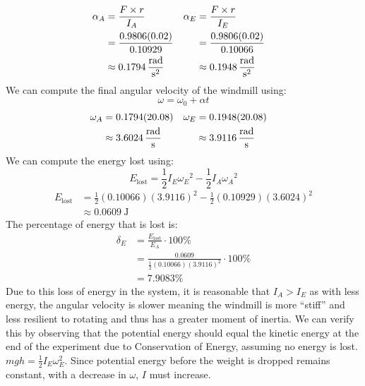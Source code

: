 \documentclass[article, 11pt]{article}
\begin{document}
    \begin{alignat*}{2}
        \begin{aligned}
            \alpha_A  &= \frac{F \times r}{I_A} \\
                      &= \frac{0.9806(0.02)}{0.10929} \\
                      &\approx \SI{0.1794}{\frac{\radian}{\second^2}}
        \end{aligned} \quad &
        \begin{aligned}
            \alpha_E &= \frac{F \times r}{I_E} \\
                     &= \frac{0.9806(0.02)}{0.10066} \\
                     &\approx \SI{0.1948}{\frac{\radian}{\second^2}}
        \end{aligned}
    \end{alignat*}
    We can compute the final angular velocity of the windmill using:
    \begin{equation*}
        \omega = \omega_0 + \alpha t
    \end{equation*}
    \begin{alignat*}{2}
        \begin{aligned}
            \omega_A &= 0.1794(20.08) \\
                     &\approx \SI{3.6024}{\frac{\radian}{\second}}
        \end{aligned} \quad &
        \begin{aligned}
            \omega_E &= 0.1948(20.08) \\
                     &\approx \SI{3.9116}{\frac{\radian}{\second}}
        \end{aligned}
    \end{alignat*}
    We can compute the energy lost using:
    \begin{equation*}
        E_\text{lost} = \frac{1}{2}I_E{\omega_E}^2 - \frac{1}{2}I_A{\omega_A}^2
    \end{equation*}
    \begin{align*}
        E_\text{lost} &= \frac{1}{2}(0.10066)(3.9116)^2 - \frac{1}{2}(0.10929)(3.6024)^2 \\
        &\approx \SI{0.0609}{\joule}
    \end{align*}
    The percentage of energy that is lost is:
    \begin{align*}
        \delta_E &= \frac{E_\text{lost}}{E_A} \cdot 100\% \\
                 &= \frac{0.0609}{\frac{1}{2}(0.10066)(3.9116)^2} \cdot 100\% \\
                 &= 7.9083\%
    \end{align*}
    Due to this loss of energy in the system, it is reasonable that $I_A > I_E$ as with less energy, the angular velocity is slower meaning the windmill is more
    ``stiff'' and less resilient to rotating and thus has a greater moment of inertia. We can verify this by observing that the potential energy should equal the kinetic energy at the end of the experiment due to Conservation of Energy, assuming no energy is lost. $mgh= \frac{1}{2}I_E\omega_E^2$. Since potential energy before the weight is dropped remains constant, with a decrease in $\omega$, $I$ must increase.
\end{document}

